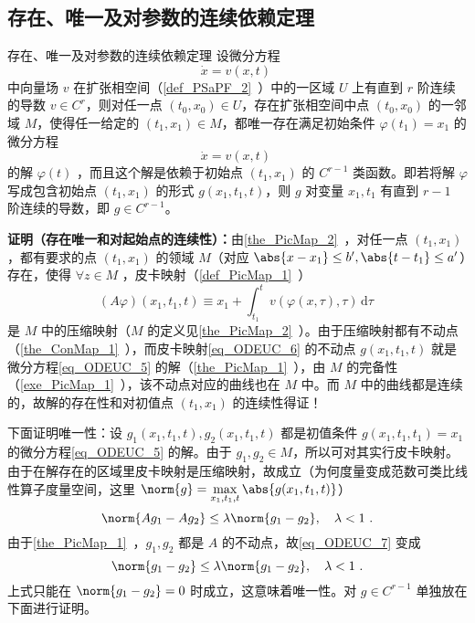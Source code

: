 \subsection{存在、唯一及对参数的连续依赖定理}
\begin{theorem}{存在、唯一及对参数的连续依赖定理}\label{the_ODEUC_1}
设微分方程
\begin{equation}\label{eq_ODEUC_9}
\dot x=v(x,t)~
\end{equation}
中向量场 $v$ 在扩张相空间（\autoref{def_PSaPF_2}~）中的一区域 $U$ 上有直到 $r$ 阶连续的导数 $v\in C^r$，则对任一点 $(t_0,x_0)\in U$，存在扩张相空间中点 $(t_0,x_0)$ 的一邻域 $M$，使得任一给定的 $(t_1,x_1)\in M$，都唯一存在满足初始条件 $\varphi(t_1)=x_1$ 的微分方程
\begin{equation}\label{eq_ODEUC_5}
\dot x=v(x,t)~
\end{equation}
的解 $\varphi(t)$ ，而且这个解是依赖于初始点 $(t_1,x_1)$ 的 $C^{r-1}$ 类函数。即若将解 $\varphi$ 写成包含初始点 $(t_1,x_1)$ 的形式 $g(x_1,t_1,t)$，则 $g$ 对变量 $x_1,t_1$ 有直到 $r-1$ 阶连续的导数，即 $g\in C^{r-1}$。
\end{theorem}
\textbf{证明（存在唯一和对起始点的连续性）：}由\autoref{the_PicMap_2}~，对任一点 $(t_1,x_1)$，都有要求的点 $(t_1,x_1)$ 的领域 $M$（对应 $\abs{x-x_1}\leq b',\abs{t-t_1}\leq a'$）存在，使得 $\forall z\in M$ ，皮卡映射（\autoref{def_PicMap_1}~）
\begin{equation}\label{eq_ODEUC_6}
(A\varphi)(x_1,t_1,t)\equiv x_1+\int_{t_1}^{t}v(\varphi(x,\tau),\tau) \,\mathrm{d}{\tau} ~
\end{equation}
是 $M$ 中的压缩映射（$M$ 的定义见\autoref{the_PicMap_2}~）。由于压缩映射都有不动点（\autoref{the_ConMap_1}~），而皮卡映射\autoref{eq_ODEUC_6} 的不动点 $g(x_1,t_1,t)$ 就是微分方程\autoref{eq_ODEUC_5} 的解（\autoref{the_PicMap_1}~），由 $M$ 的完备性（\autoref{exe_PicMap_1}~），该不动点对应的曲线也在 $M$ 中。而 $M$ 中的曲线都是连续的，故解的存在性和对初值点 $(t_1,x_1)$ 的连续性得证！

下面证明唯一性：设 $g_1(x_1,t_1,t),g_2(x_1,t_1,t)$ 都是初值条件 $g(x_1,t_1,t_1)=x_1$ 的微分方程\autoref{eq_ODEUC_5} 的解。由于 $g_1,g_2\in M$，所以可对其实行皮卡映射。由于在解存在的区域里皮卡映射是压缩映射，故成立（为何度量变成范数可类比线性算子度量空间，这里 $\norm{g}=\max\limits_{x_1,t_1,t}\abs{g(x_1,t_1,t)}$）
\begin{equation}\label{eq_ODEUC_7}
\norm{A g_1-A g_2}\leq\lambda\norm{g_1-g_2},\quad\lambda<1~.
\end{equation}
由于\autoref{the_PicMap_1}~，$g_1,g_2$ 都是 $A$ 的不动点，故\autoref{eq_ODEUC_7} 变成
\begin{equation}
\norm{g_1-g_2}\leq\lambda\norm{g_1-g_2},\quad\lambda<1~.
\end{equation}
上式只能在 $\norm{g_1-g_2}=0$ 时成立，这意味着唯一性。对 $g\in C^{r-1}$ 单独放在下面进行证明。


